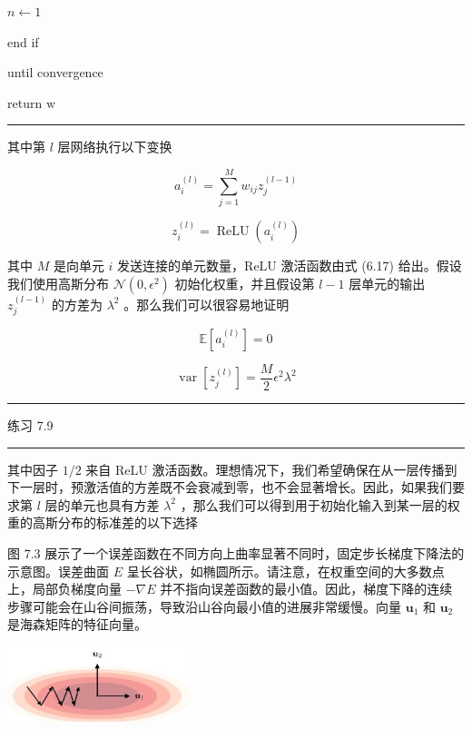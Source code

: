 \documentclass[10pt]{article}
\newcommand{\HRule}{\begin{center}\rule{0.9\linewidth}{0.2mm}\end{center}}
\begin{document}
\hspace*{2em} \(n \leftarrow  1\)

\hspace*{1em} end if

until convergence

return \(\mathrm{w}\)

\HRule

其中第 \(l\) 层网络执行以下变换

\[
{a}_{i}^{\left( l\right) } = \mathop{\sum }\limits_{{j = 1}}^{M}{w}_{ij}{z}_{j}^{\left( l - 1\right) } \tag{7.19}
\]

\[
{z}_{i}^{\left( l\right) } = \operatorname{ReLU}\left( {a}_{i}^{\left( l\right) }\right)  \tag{7.20}
\]

其中 \(M\) 是向单元 \(i\) 发送连接的单元数量，ReLU 激活函数由式 (6.17) 给出。假设我们使用高斯分布 \(\mathcal{N}\left( {0,{\epsilon }^{2}}\right)\) 初始化权重，并且假设第 \(l - 1\) 层单元的输出 \({z}_{j}^{\left( l - 1\right) }\) 的方差为 \({\lambda }^{2}\) 。那么我们可以很容易地证明

\[
\mathbb{E}\left\lbrack  {a}_{i}^{\left( l\right) }\right\rbrack   = 0 \tag{7.21}
\]

\[
\operatorname{var}\left\lbrack  {z}_{j}^{\left( l\right) }\right\rbrack   = \frac{M}{2}{\epsilon }^{2}{\lambda }^{2} \tag{7.22}
\]

\HRule

练习 7.9

\HRule

其中因子 \(1/2\) 来自 ReLU 激活函数。理想情况下，我们希望确保在从一层传播到下一层时，预激活值的方差既不会衰减到零，也不会显著增长。因此，如果我们要求第 \(l\) 层的单元也具有方差 \({\lambda }^{2}\) ，那么我们可以得到用于初始化输入到某一层的权重的高斯分布的标准差的以下选择

图 7.3 展示了一个误差函数在不同方向上曲率显著不同时，固定步长梯度下降法的示意图。误差曲面 \(E\) 呈长谷状，如椭圆所示。请注意，在权重空间的大多数点上，局部负梯度向量 \(- \nabla E\) 并不指向误差函数的最小值。因此，梯度下降的连续步骤可能会在山谷间振荡，导致沿山谷向最小值的进展非常缓慢。向量 \({\mathbf{u}}_{1}\) 和 \({\mathbf{u}}_{2}\) 是海森矩阵的特征向量。

\begin{center}
\includegraphics[max width=0.4\textwidth]{images/0194e279-9b28-703a-88f4-c3ac21e2010d_237_972_355_573_237_0.jpg}
\end{center}
\hspace*{3em} 
\end{document}
